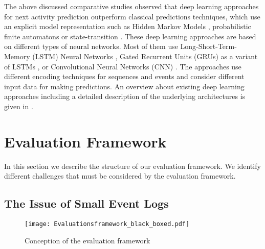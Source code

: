 \documentclass[runningheads]{llncs}
\begin{document}
The above discussed comparative studies observed that deep learning approaches for next activity prediction outperform classical predictions techniques, which use an explicit model representation such as Hidden Markov Models \cite{Lakshmanan}, probabilistic finite automatons or state-transition \cite{Breuker,Unuvar}. These deep learning approaches are based on different types of neural networks. Most of them use Long-Short-Term-Memory (LSTM) Neural Networks \cite{camargo_lstm_2019,Tax2017,Evermann2017,Schonig:2018:DLP:3362381.3362411}, Gated Recurrent Units (GRUs) as a variant of LSTMs \cite{Hinkka}, or Convolutional Neural Networks (CNN) \cite{Pasquadibisceglie,Mauro}. The approaches use different encoding techniques for sequences and events and consider different input data for making predictions. An overview about existing deep learning approaches including a detailed description of the underlying architectures is given in \cite{RamaManeiro2020}.

\section{Evaluation Framework}\label{Sec:Evaluation-Framework}
\vspace{-8pt}
In this section we describe the structure of our evaluation framework. We identify different challenges that must be considered by the evaluation framework.
\vspace{-8pt}
\subsection{The Issue of Small Event Logs}\label{Sec:The-issue-of-small-event-logs}
\begin{figure}[t]
			\setlength{\belowcaptionskip}{-16pt}
	\centering
	\texttt{[image: Evaluationsframework\_black\_boxed.pdf]}
	\caption{Conception of the evaluation framework}
	\label{abstract-concept}
\end{figure}
\end{document}
